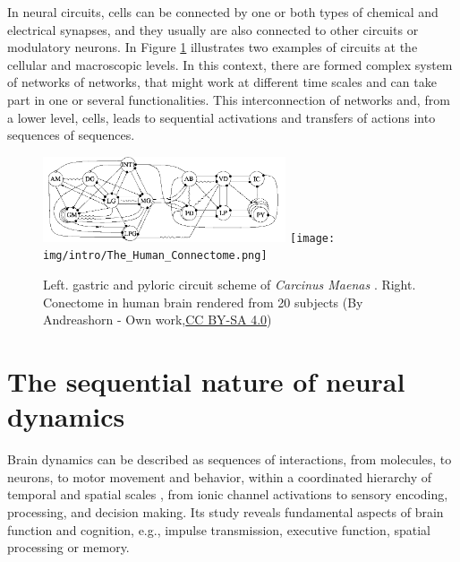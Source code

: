 In neural circuits, cells  can be connected by one or both types of chemical and electrical synapses, and they usually are also connected to other circuits or modulatory neurons. In Figure \ref{fig:neural circuits} illustrates two examples of circuits at the cellular and macroscopic levels. In this context, there are formed complex system of networks of networks, that might work at different time scales and can take part in one or several functionalities. This interconnection of networks and, from a lower level, cells, leads to sequential activations and transfers of actions into sequences of sequences.


\begin{figure}[hbt!]
    \centering
    \includegraphics[width=0.64\textwidth]{img/intro/cpg diagram.png}
    \texttt{[image: img/intro/The\_Human\_Connectome.png]}
    \caption{Left. gastric and pyloric circuit scheme of \textit{Carcinus Maenas} \parencite{huerta_topology_2001}. Right. Conectome in human brain rendered from 20 subjects (By Andreashorn - Own work,\href{https://commons.wikimedia.org/w/index.php?curid=41581320}{CC BY-SA 4.0})}
    \label{fig:neural circuits}
\end{figure}

\section{The sequential nature of neural dynamics}
Brain dynamics can be described as sequences of interactions, from molecules, to neurons, to motor movement and behavior, within a coordinated hierarchy of temporal and spatial scales \parencite{kiebel_hierarchy_2008,yuste05,rabinovich_discrete_2018,Rabinovich23},  from ionic channel activations to sensory encoding, processing, and decision making. Its study reveals fundamental aspects of brain function and cognition, e.g., impulse transmission, executive function, spatial processing or memory.

